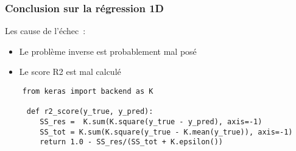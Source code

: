 \begin{frame}[fragile]
    \frametitle{Conclusion sur la régression 1D}
Les cause de l'échec :
\pause
\begin{itemize}
    \item Le problème inverse est probablement mal posé  %
    \item Le score R2 est mal calculé %
\end{itemize}
\scriptsize

\begin{verbatim}
    from keras import backend as K
    
     def r2_score(y_true, y_pred):
        SS_res =  K.sum(K.square(y_true - y_pred), axis=-1) 
        SS_tot = K.sum(K.square(y_true - K.mean(y_true)), axis=-1)
        return 1.0 - SS_res/(SS_tot + K.epsilon())
\end{verbatim}

\end{frame}


% 
